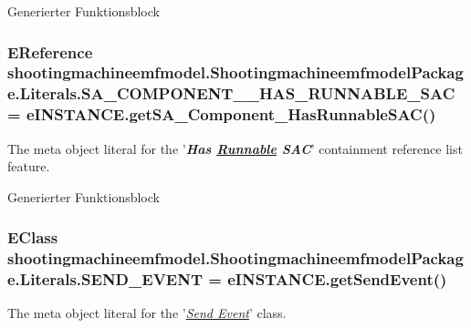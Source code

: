 Generierter Funktionsblock \hypertarget{interfaceshootingmachineemfmodel_1_1_shootingmachineemfmodel_package_1_1_literals_af59a0a37c624a31d6acbfecca3f1bc0b}{
\subsubsection[{S\-A\-\_\-\-C\-O\-M\-P\-O\-N\-E\-N\-T\-\_\-\-\_\-\-H\-A\-S\-\_\-\-R\-U\-N\-N\-A\-B\-L\-E\-\_\-\-S\-A\-C}]{\setlength{\rightskip}{0pt plus 5cm}E\-Reference shootingmachineemfmodel.\-Shootingmachineemfmodel\-Package.\-Literals.\-S\-A\-\_\-\-C\-O\-M\-P\-O\-N\-E\-N\-T\-\_\-\-\_\-\-H\-A\-S\-\_\-\-R\-U\-N\-N\-A\-B\-L\-E\-\_\-\-S\-A\-C = e\-I\-N\-S\-T\-A\-N\-C\-E.\-get\-S\-A\-\_\-\-Component\-\_\-\-Has\-Runnable\-S\-A\-C()}}\label{interfaceshootingmachineemfmodel_1_1_shootingmachineemfmodel_package_1_1_literals_af59a0a37c624a31d6acbfecca3f1bc0b}
The meta object literal for the '{\itshape {\bfseries Has \hyperlink{interfaceshootingmachineemfmodel_1_1_runnable}{Runnable} S\-A\-C}}' containment reference list feature.

Generierter Funktionsblock \hypertarget{interfaceshootingmachineemfmodel_1_1_shootingmachineemfmodel_package_1_1_literals_a317aabab1ec23d18b8de6dd458f47caa}{
\subsubsection[{S\-E\-N\-D\-\_\-\-E\-V\-E\-N\-T}]{\setlength{\rightskip}{0pt plus 5cm}E\-Class shootingmachineemfmodel.\-Shootingmachineemfmodel\-Package.\-Literals.\-S\-E\-N\-D\-\_\-\-E\-V\-E\-N\-T = e\-I\-N\-S\-T\-A\-N\-C\-E.\-get\-Send\-Event()}}\label{interfaceshootingmachineemfmodel_1_1_shootingmachineemfmodel_package_1_1_literals_a317aabab1ec23d18b8de6dd458f47caa}
The meta object literal for the '\hyperlink{classshootingmachineemfmodel_1_1impl_1_1_send_event_impl}{{\itshape Send Event}}' class.

